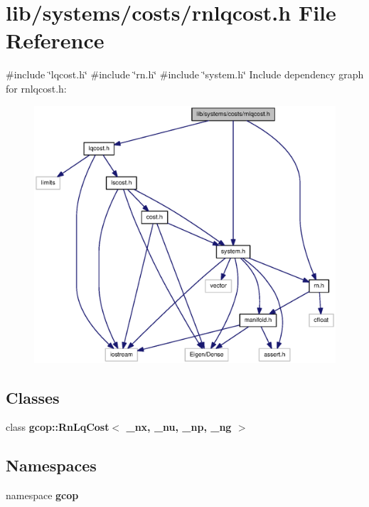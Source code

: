 \section{lib/systems/costs/rnlqcost.h \-File \-Reference}
\label{rnlqcost_8h}
{\ttfamily \#include \char`\"{}lqcost.\-h\char`\"{}}\*
{\ttfamily \#include \char`\"{}rn.\-h\char`\"{}}\*
{\ttfamily \#include \char`\"{}system.\-h\char`\"{}}\*
\-Include dependency graph for rnlqcost.\-h\-:
\nopagebreak
\begin{figure}[H]
\begin{center}
\leavevmode
\includegraphics[width=350pt]{rnlqcost_8h__incl}
\end{center}
\end{figure}
\subsection*{\-Classes}
\begin{DoxyCompactItemize}
\item 
class {\bf gcop\-::\-Rn\-Lq\-Cost$<$ \-\_\-nx, \-\_\-nu, \-\_\-np, \-\_\-ng $>$}
\end{DoxyCompactItemize}
\subsection*{\-Namespaces}
\begin{DoxyCompactItemize}
\item 
namespace {\bf gcop}
\end{DoxyCompactItemize}
